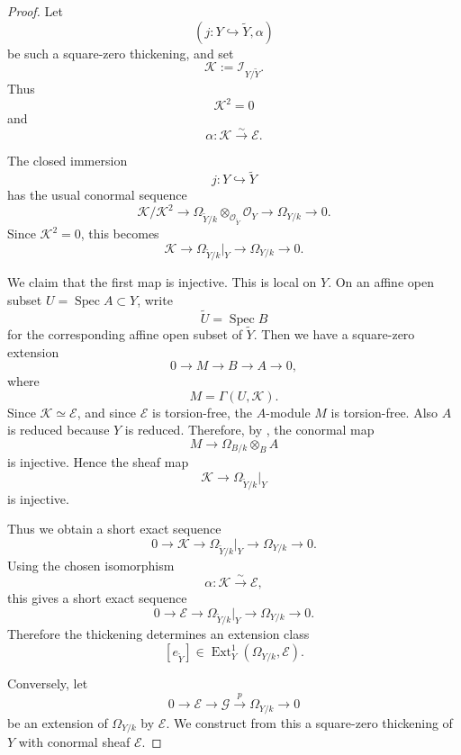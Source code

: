 \documentclass[11pt,twoside]{amsart}
\theoremstyle{plain}
\numberwithin{equation}{section}
\theoremstyle{definition}
\begin{document}
\begin{proof}
Let
\[
    (j:Y\hookrightarrow \widetilde Y,\alpha)
\]
be such a square-zero thickening, and set
\[
    \mathcal K:=\mathcal I_{Y/\widetilde Y}.
\]
Thus
\[
    \mathcal K^{2}=0
\]
and
\[
    \alpha:\mathcal K\xrightarrow{\sim}\mathcal E.
\]

The closed immersion
\[
    j:Y\hookrightarrow \widetilde Y
\]
has the usual conormal sequence
\[
    \mathcal K/\mathcal K^{2}
    \longrightarrow
    \Omega_{\widetilde Y/k}\otimes_{\mathcal O_{\widetilde Y}}\mathcal O_Y
    \longrightarrow
    \Omega_{Y/k}
    \longrightarrow 0.
\]
Since \(\mathcal K^2=0\), this becomes
\[
    \mathcal K
    \longrightarrow
    \Omega_{\widetilde Y/k}|_Y
    \longrightarrow
    \Omega_{Y/k}
    \longrightarrow 0.
\]

We claim that the first map is injective. This is local on \(Y\). On an affine open
subset \(U=\operatorname{Spec}A\subset Y\), write
\[
    \widetilde U=\operatorname{Spec}B
\]
for the corresponding affine open subset of \(\widetilde Y\). Then we have a
square-zero extension
\[
    0\longrightarrow M\longrightarrow B\longrightarrow A\longrightarrow 0,
\]
where
\[
    M=\Gamma(U,\mathcal K).
\]
Since \(\mathcal K\simeq\mathcal E\), and since \(\mathcal E\) is torsion-free, the
\(A\)-module \(M\) is torsion-free. Also \(A\) is reduced because \(Y\) is reduced.
Therefore, by , the conormal map
\[
    M
    \longrightarrow
    \Omega_{B/k}\otimes_B A
\]
is injective. Hence the sheaf map
\[
    \mathcal K
    \longrightarrow
    \Omega_{\widetilde Y/k}|_Y
\]
is injective.

Thus we obtain a short exact sequence
\[
    0
    \longrightarrow
    \mathcal K
    \longrightarrow
    \Omega_{\widetilde Y/k}|_Y
    \longrightarrow
    \Omega_{Y/k}
    \longrightarrow 0.
\]
Using the chosen isomorphism
\[
    \alpha:\mathcal K\xrightarrow{\sim}\mathcal E,
\]
this gives a short exact sequence
\[
    0
    \longrightarrow
    \mathcal E
    \longrightarrow
    \Omega_{\widetilde Y/k}|_Y
    \longrightarrow
    \Omega_{Y/k}
    \longrightarrow 0.
\]
Therefore the thickening determines an extension class
\[
    [e_{\widetilde Y}]
    \in
    \operatorname{Ext}^{1}_{Y}(\Omega_{Y/k},\mathcal E).
\]

Conversely, let
\[
    0
    \longrightarrow
    \mathcal E
    \longrightarrow
    \mathcal G
    \xrightarrow{p}
    \Omega_{Y/k}
    \longrightarrow 0
\]
be an extension of \(\Omega_{Y/k}\) by \(\mathcal E\). We construct from this a
square-zero thickening of \(Y\) with conormal sheaf \(\mathcal E\).


\end{proof}
\end{document}
